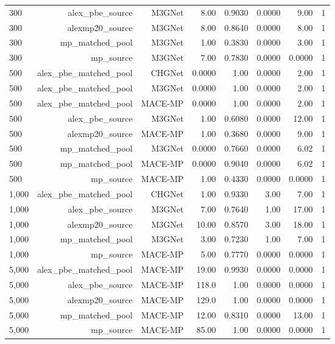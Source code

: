 \begin{table}[H]
\begin{adjustbox}{max width=\linewidth}
\begin{tabular}{@{}lrrrrrrr@{}}
300 & alex\_pbe\_source & M3GNet & 8.00 & 0.9030 & 0.0000 & 9.00 & 1 \\
300 & alexmp20\_source & M3GNet & 8.00 & 0.8640 & 0.0000 & 8.00 & 1 \\
300 & mp\_matched\_pool & M3GNet & 1.00 & 0.3830 & 0.0000 & 3.00 & 1 \\
300 & mp\_source & M3GNet & 7.00 & 0.7830 & 0.0000 & 0.0000 & 1 \\
500 & alex\_pbe\_matched\_pool & CHGNet & 0.0000 & 1.00 & 0.0000 & 2.00 & 1 \\
500 & alex\_pbe\_matched\_pool & M3GNet & 0.0000 & 1.00 & 0.0000 & 2.00 & 1 \\
500 & alex\_pbe\_matched\_pool & MACE-MP & 0.0000 & 1.00 & 0.0000 & 2.00 & 1 \\
500 & alex\_pbe\_source & M3GNet & 1.00 & 0.6080 & 0.0000 & 12.00 & 1 \\
500 & alexmp20\_source & MACE-MP & 1.00 & 0.3680 & 0.0000 & 9.00 & 1 \\
500 & mp\_matched\_pool & M3GNet & 0.0000 & 0.7660 & 0.0000 & 6.02 & 1 \\
500 & mp\_matched\_pool & MACE-MP & 0.0000 & 0.9040 & 0.0000 & 6.02 & 1 \\
500 & mp\_source & MACE-MP & 1.00 & 0.4330 & 0.0000 & 0.0000 & 1 \\
1,000 & alex\_pbe\_matched\_pool & CHGNet & 1.00 & 0.9330 & 3.00 & 7.00 & 1 \\
1,000 & alex\_pbe\_source & M3GNet & 7.00 & 0.7640 & 1.00 & 17.00 & 1 \\
1,000 & alexmp20\_source & M3GNet & 10.00 & 0.8570 & 3.00 & 18.00 & 1 \\
1,000 & mp\_matched\_pool & M3GNet & 3.00 & 0.7230 & 1.00 & 7.00 & 1 \\
1,000 & mp\_source & MACE-MP & 5.00 & 0.7770 & 0.0000 & 0.0000 & 1 \\
5,000 & alex\_pbe\_matched\_pool & MACE-MP & 19.00 & 0.9930 & 0.0000 & 0.0000 & 1 \\
5,000 & alex\_pbe\_source & MACE-MP & 118.0 & 1.00 & 0.0000 & 0.0000 & 1 \\
5,000 & alexmp20\_source & MACE-MP & 129.0 & 1.00 & 0.0000 & 0.0000 & 1 \\
5,000 & mp\_matched\_pool & MACE-MP & 12.00 & 0.8310 & 0.0000 & 13.00 & 1 \\
5,000 & mp\_source & MACE-MP & 85.00 & 1.00 & 0.0000 & 0.0000 & 1 \\
\bottomrule
\end{tabular}
\end{adjustbox}
\end{table}


